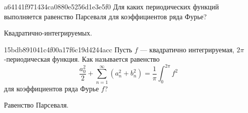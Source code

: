\begin{note}{a64141f971434ca0880e5256d1e3e5f0}
    Для каких периодических функций выполняется равенство Парсеваля для коэффициентов ряда Фурье?

    \begin{cloze}{1}
        Квадратично-интегрируемых.
    \end{cloze}
\end{note}

\begin{note}{15bdb891041c4f00a17f6c19d4244acc}
    Пусть \({ f }\) --- квадратично интегрируемая, \({ 2\pi }\)-периодическая функция.
    Как называется равенство
    \[
        \frac{a_0^2}{2} + \sum_{n=1}^{\infty} (a_n^2 + b_n^2) = \frac{1}{\pi} \int_{0}^{2\pi} f^2
    \]
    для коэффициентов ряда Фурье \({ f }\)?

    \begin{cloze}{1}
        Равенство Парсеваля.
    \end{cloze}
\end{note}


